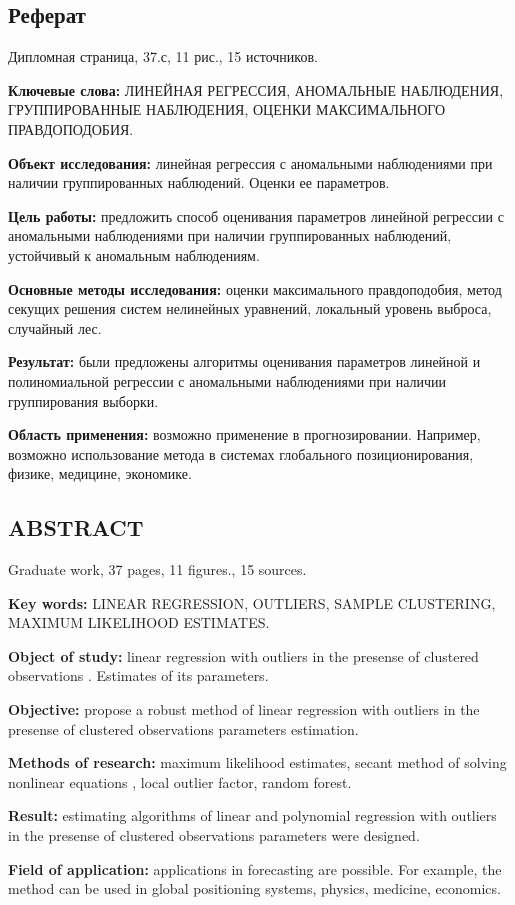 \begin{center}
    \section*{Реферат}
\end{center}
\linespread{1.3}
\thispagestyle{empty}

Дипломная страница, 37.с, 11 рис., 15 источников.

\textbf{Ключевые слова:} ЛИНЕЙНАЯ РЕГРЕССИЯ, АНОМАЛЬНЫЕ НАБЛЮДЕНИЯ, ГРУППИРОВАННЫЕ НАБЛЮДЕНИЯ, ОЦЕНКИ МАКСИМАЛЬНОГО ПРАВДОПОДОБИЯ.

\textbf{Объект исследования:} линейная регрессия с аномальными наблюдениями при наличии группированных наблюдений. Оценки ее параметров.

\textbf{Цель работы:} предложить способ оценивания параметров линейной регрессии с аномальными наблюдениями при наличии группированных наблюдений, устойчивый к аномальным наблюдениям.

\textbf{Основные методы исследования:} оценки максимального правдоподобия, метод секущих решения систем нелинейных уравнений, локальный уровень выброса, случайный лес.

\textbf{Результат:} были предложены алгоритмы оценивания параметров линейной и полиномиальной регрессии с аномальными наблюдениями при наличии группирования выборки.

\textbf{Область применения:} возможно применение в прогнозировании. Например, возможно использование метода в системах глобального позиционирования, физике, медицине, экономике. 

\newpage
\thispagestyle{empty}


\begin{center}
    \section*{ABSTRACT}
\end{center}

Graduate work, 37 pages, 11 figures., 15 sources.

\textbf{Key words:} LINEAR REGRESSION, OUTLIERS, SAMPLE CLUSTERING, MAXIMUM LIKELIHOOD ESTIMATES.

\textbf{Object of study:} linear regression with outliers in the presense of clustered observations . Estimates of its parameters.

\textbf{Objective:} propose a robust method of linear regression with outliers in the presense of clustered observations parameters estimation.

\textbf{Methods of research:} maximum likelihood estimates, secant method of solving nonlinear equations , local outlier factor, random forest.

\textbf{Result:} estimating algorithms of linear and polynomial regression with outliers in the presense of clustered observations parameters were designed.

\textbf{Field of application:} applications in forecasting are possible. For example, the method can be used in global positioning systems, physics, medicine, economics. 